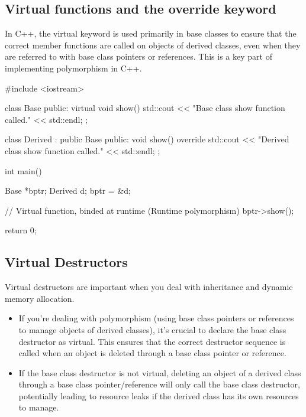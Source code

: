 \documentclass{report}
\begin{document}
    \subsection{Virtual functions and the override keyword}
    \bigbreak \noindent 
    \begin{concept}
       In C++, the virtual keyword is used primarily in base classes to ensure that the correct member functions are called on objects of derived classes, even when they are referred to with base class pointers or references. This is a key part of implementing polymorphism in C++. 
    \end{concept}
    \bigbreak \noindent 
    \begin{cppcode}
#include <iostream>

class Base {
public:
    virtual void show() {
        std::cout << "Base class show function called." << std::endl;
    }
};

class Derived : public Base {
public:
    void show() override {
        std::cout << "Derived class show function called." << std::endl;
    }
};

int main() {
    Base *bptr;
    Derived d;
    bptr = &d;

    // Virtual function, binded at runtime (Runtime polymorphism)
    bptr->show();

    return 0;
}
    \end{cppcode}


    \bigbreak \noindent 
    \subsection{Virtual Destructors}
    \bigbreak \noindent 
    \begin{concept}
        Virtual destructors are important when you deal with inheritance and dynamic memory allocation. 
        \begin{itemize}
            \item If you're dealing with polymorphism (using base class pointers or references to manage objects of derived classes), it's crucial to declare the base class destructor as virtual. This ensures that the correct destructor sequence is called when an object is deleted through a base class pointer or reference.
            \item If the base class destructor is not virtual, deleting an object of a derived class through a base class pointer/reference will only call the base class destructor, potentially leading to resource leaks if the derived class has its own resources to manage.
        \end{itemize}
    \end{concept}
\end{document}
